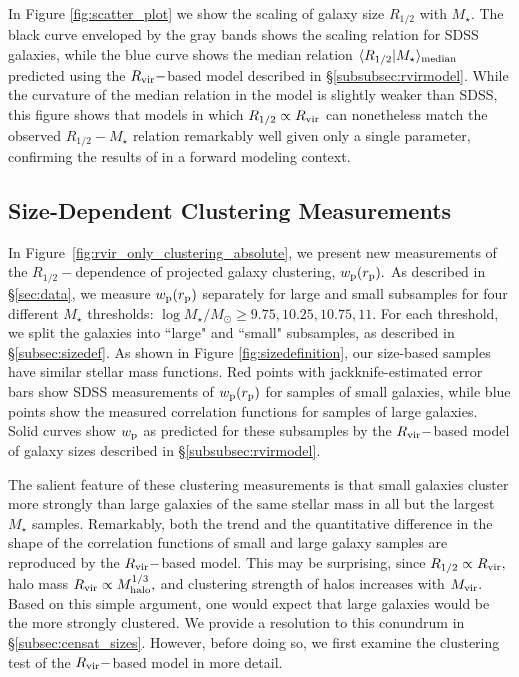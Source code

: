 \documentclass[usenatbib,usegraphicx,letterpaper]{mn2e}
\newcommand{\rhalf}{R_{1/2}}
\newcommand{\mstar}{M_{\star}}
\newcommand{\mvir}{M_{\rm vir}}
\newcommand{\mhalo}{M_{\rm halo}}
\newcommand{\rvir}{R_{\rm vir}}
\newcommand{\rproj}{r_{\rm p}}
\newcommand{\wproj}{w_{\rm p}}
\newcommand{\median}[2]{\langle{#1}\vert{#2}\rangle_{\rm median}}
\newcommand{\msun}{M_\odot}
\begin{document}
In Figure \ref{fig:scatter_plot} we show the scaling of galaxy size $\rhalf$ with $\mstar.$ The black curve enveloped by the gray bands shows the scaling relation for SDSS galaxies, while the blue curve shows the median relation  $\median{\rhalf}{\mstar}$ predicted using the $\rvir-$based model described in \S\ref{subsubsec:rvirmodel}. While the curvature of the median relation in the model is slightly weaker than SDSS, this figure shows that models in which $\rhalf\propto\rvir$ can nonetheless match the observed $\rhalf-\mstar$ relation remarkably well given only a single parameter, confirming the results of \citet{kravtsov13} in a forward modeling context.

\subsection{Size-Dependent Clustering Measurements}
\label{subsec:clustering_results}

In Figure~\ref{fig:rvir_only_clustering_absolute}, we present new measurements of the $\rhalf-$dependence of projected galaxy clustering, $\wproj(\rproj).$ As described in \S\ref{sec:data}, we measure $\wproj(\rproj)$ separately for large and small subsamples for four different $\mstar$ thresholds: $\log\mstar/\msun\geq 9.75, 10.25, 10.75, 11.$
For each threshold, we split the galaxies into ``large" and ``small" subsamples, as described in \S\ref{subsec:sizedef}. As shown in Figure \ref{fig:sizedefinition}, our size-based samples  have similar stellar mass functions. Red points with jackknife-estimated error bars show SDSS measurements of $\wproj(\rproj)$ for samples of small galaxies, while blue points show the measured correlation functions for samples of large galaxies. Solid curves show $\wproj$ as predicted for these subsamples by the $\rvir-$based model of galaxy sizes described in \S\ref{subsubsec:rvirmodel}.

The salient feature of these clustering measurements is that small galaxies cluster more strongly than large galaxies of the same stellar mass in all but the largest $\mstar$ samples. Remarkably, both the trend and the quantitative difference in the shape of the correlation functions of small and large galaxy samples are reproduced by the $\rvir-$based model. This may be surprising, since $\rhalf\propto\rvir,$ halo mass $\rvir\propto\mhalo^{1/3},$ and clustering strength of halos increases with $\mvir.$ Based on this simple argument, one would expect that large galaxies would be the more strongly clustered. We provide a resolution to this conundrum in \S\ref{subsec:censat_sizes}. However,  before doing so, we first examine the clustering test of the $\rvir-$based model in more detail.
\end{document}
